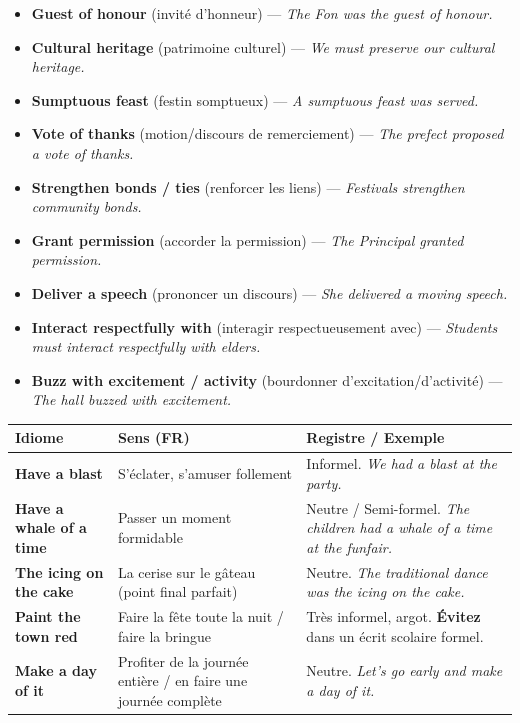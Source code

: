 \documentclass[11pt]{article}
\newcommand{\eng}[1]{\ifmmode\text{\textit{#1}}\else\begingroup\selectlanguage{english}\itshape #1\endgroup\fi}
\begin{document}
\begin{exemplebox}
\begin{itemize}
\item \textbf{Guest of honour} (invité d'honneur) — \textit{The Fon was the guest of honour.}
\item \textbf{Cultural heritage} (patrimoine culturel) — \textit{We must preserve our cultural heritage.}
\item \textbf{Sumptuous feast} (festin somptueux) — \textit{A sumptuous feast was served.}
\item \textbf{Vote of thanks} (motion/discours de remerciement) — \textit{The prefect proposed a vote of thanks.}
\item \textbf{Strengthen bonds / ties} (renforcer les liens) — \textit{Festivals strengthen community bonds.}
\item \textbf{Grant permission} (accorder la permission) — \textit{The Principal granted permission.}
\item \textbf{Deliver a speech} (prononcer un discours) — \textit{She delivered a moving speech.}
\item \textbf{Interact respectfully with} (interagir respectueusement avec) — \textit{Students must interact respectfully with elders.}
\item \textbf{Buzz with excitement / activity} (bourdonner d'excitation/d'activité) — \textit{The hall buzzed with excitement.}
\end{itemize}
\end{exemplebox}

\begin{exemplebox}
\begin{center}
\begin{tabularx}{\linewidth}{|l|X|X|}\hline
\rowcolor{poporangeL} \textbf{Idiome} & \textbf{Sens (FR)} & \textbf{Registre / Exemple} \\ \hline
\textbf{Have a blast} & S'éclater, s'amuser follement & Informel. \eng{We had a blast at the party.} \\ \hline
\textbf{Have a whale of a time} & Passer un moment formidable & Neutre / Semi-formel. \eng{The children had a whale of a time at the funfair.} \\ \hline
\textbf{The icing on the cake} & La cerise sur le gâteau (point final parfait) & Neutre. \eng{The traditional dance was the icing on the cake.} \\ \hline
\textbf{Paint the town red} & Faire la fête toute la nuit / faire la bringue & Très informel, argot. \textbf{Évitez} dans un écrit scolaire formel. \\ \hline
\textbf{Make a day of it} & Profiter de la journée entière / en faire une journée complète & Neutre. \eng{Let's go early and make a day of it.} \\ \hline
\end{tabularx}
\end{center}
\end{exemplebox}
\end{document}
